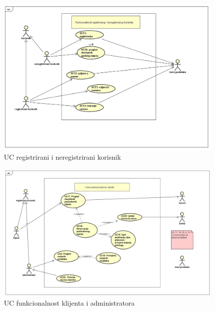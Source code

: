 \begin{packed_item}
					\begin{figure}[H]

						\includegraphics[width=\textwidth]{slike/slika.jpeg} %
						\centering
						\caption{UC registrirani i neregistrirani korisnik}
						\label{fig:registrirani4312}
					\end{figure}
					
                    \begin{figure}[H]
						\includegraphics[width=\textwidth]{slike/klijent.PNG} %
						\caption{UC funkcionalnost klijenta i administratora}
						\label{fig:klijent}
					\end{figure}
				

\end{packed_item}
